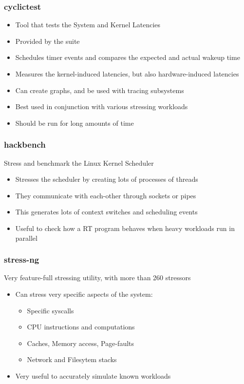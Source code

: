 \begin{frame}
	\frametitle{cyclictest}
	\begin{itemize}
		\item Tool that tests the System and Kernel Latencies
		\item Provided by the  suite
		\item Schedules timer events and compares the expected and actual wakeup time
		\item Measures the kernel-induced latencies, but also hardware-induced latencies
		\item Can create graphs, and be used with tracing subsystems
		\item Best used in conjunction with various stressing workloads
		\item Should be run for long amounts of time
	\end{itemize}
\end{frame}

\begin{frame}
	\frametitle{hackbench}
	Stress and benchmark the Linux Kernel Scheduler
	\begin{itemize}
		\item Stresses the scheduler by creating lots of processes of threads
		\item They communicate with each-other through sockets or pipes
		\item This generates lots of context switches and scheduling events
		\item Useful to check how a RT program behaves when heavy workloads run in parallel
	\end{itemize}
\end{frame}

\begin{frame}
	\frametitle{stress-ng}
	Very feature-full stressing utility, with more than 260 stressors
	\begin{itemize}
		\item Can stress very specific aspects of the system:
			\begin{itemize}
				\item Specific syscalls
				\item CPU instructions and computations
				\item Caches, Memory access, Page-faults
				\item Network and Filesytem stacks
			\end{itemize}
		\item Very useful to accurately simulate known workloads
	\end{itemize}
\end{frame}

